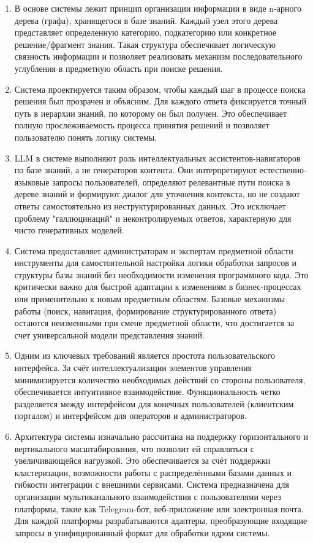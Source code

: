 \begin{enumerate}[label=\arabic*.]
    \item В основе системы лежит принцип организации информации в виде n-арного дерева (графа), хранящегося в базе знаний. Каждый узел этого дерева представляет определенную категорию, подкатегорию или конкретное решение/фрагмент знания. Такая структура обеспечивает логическую связность информации и позволяет реализовать механизм последовательного углубления в предметную область при поиске решения.
    \item Система проектируется таким образом, чтобы каждый шаг в процессе поиска решения был прозрачен и объясним. Для каждого ответа фиксируется точный путь в иерархии знаний, по которому он был получен. Это обеспечивает полную прослеживаемость процесса принятия решений и позволяет пользователю понять логику системы.
    \item LLM в системе выполняют роль интеллектуальных ассистентов-навигаторов по базе знаний, а не генераторов контента. Они интерпретируют естественно-языковые запросы пользователей, определяют релевантные пути поиска в дереве знаний и формируют диалог для уточнения контекста, но не создают ответы самостоятельно из неструктурированных данных. Это исключает проблему "галлюцинаций" и неконтролируемых ответов, характерную для чисто генеративных моделей.
    \item Система предоставляет администраторам и экспертам предметной области инструменты для самостоятельной настройки логики обработки запросов и структуры базы знаний без необходимости изменения программного кода. Это критически важно для быстрой адаптации к изменениям в бизнес-процессах или применительно к новым предметным областям. Базовые механизмы работы (поиск, навигация, формирование структурированного ответа) остаются неизменными при смене предметной области, что достигается за счет универсальной модели представления знаний.
    \item Одним из ключевых требований является простота пользовательского интерфейса. За счёт интеллектуализации элементов управления минимизируется количество необходимых действий со стороны пользователя, обеспечивается интуитивное взаимодействие. Функциональность четко разделяется между интерфейсом для конечных пользователей (клиентским порталом) и интерфейсом для операторов и администраторов.
    \item Архитектура системы изначально рассчитана на поддержку горизонтального и вертикального масштабирования, что позволит ей справляться с увеличивающейся нагрузкой. Это обеспечивается за счёт поддержки кластеризации, возможности работы с распределёнными базами данных и гибкости интеграции с внешними сервисами. Система предназначена для организации мультиканального взаимодействия с пользователями через платформы, такие как Telegram-бот, веб-приложение или электронная почта. Для каждой платформы разрабатываются адаптеры, преобразующие входящие запросы в унифицированный формат для обработки ядром системы.
\end{enumerate}

